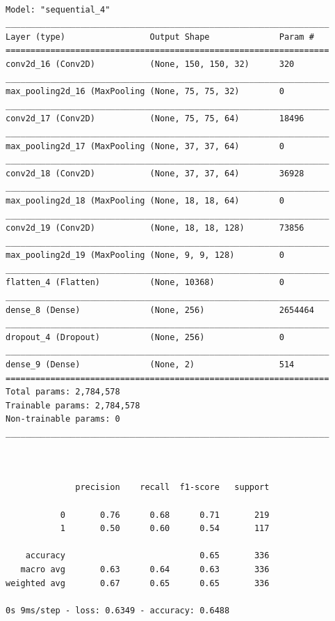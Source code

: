 \documentclass{article}
\begin{document}
\begin{verbatim}

Model: "sequential_4"
_________________________________________________________________
Layer (type)                 Output Shape              Param #   
=================================================================
conv2d_16 (Conv2D)           (None, 150, 150, 32)      320       
_________________________________________________________________
max_pooling2d_16 (MaxPooling (None, 75, 75, 32)        0         
_________________________________________________________________
conv2d_17 (Conv2D)           (None, 75, 75, 64)        18496     
_________________________________________________________________
max_pooling2d_17 (MaxPooling (None, 37, 37, 64)        0         
_________________________________________________________________
conv2d_18 (Conv2D)           (None, 37, 37, 64)        36928     
_________________________________________________________________
max_pooling2d_18 (MaxPooling (None, 18, 18, 64)        0         
_________________________________________________________________
conv2d_19 (Conv2D)           (None, 18, 18, 128)       73856     
_________________________________________________________________
max_pooling2d_19 (MaxPooling (None, 9, 9, 128)         0         
_________________________________________________________________
flatten_4 (Flatten)          (None, 10368)             0         
_________________________________________________________________
dense_8 (Dense)              (None, 256)               2654464   
_________________________________________________________________
dropout_4 (Dropout)          (None, 256)               0         
_________________________________________________________________
dense_9 (Dense)              (None, 2)                 514       
=================================================================
Total params: 2,784,578
Trainable params: 2,784,578
Non-trainable params: 0
_________________________________________________________________



              precision    recall  f1-score   support

           0       0.76      0.68      0.71       219
           1       0.50      0.60      0.54       117

    accuracy                           0.65       336
   macro avg       0.63      0.64      0.63       336
weighted avg       0.67      0.65      0.65       336

0s 9ms/step - loss: 0.6349 - accuracy: 0.6488

\end{verbatim}
\end{document}
